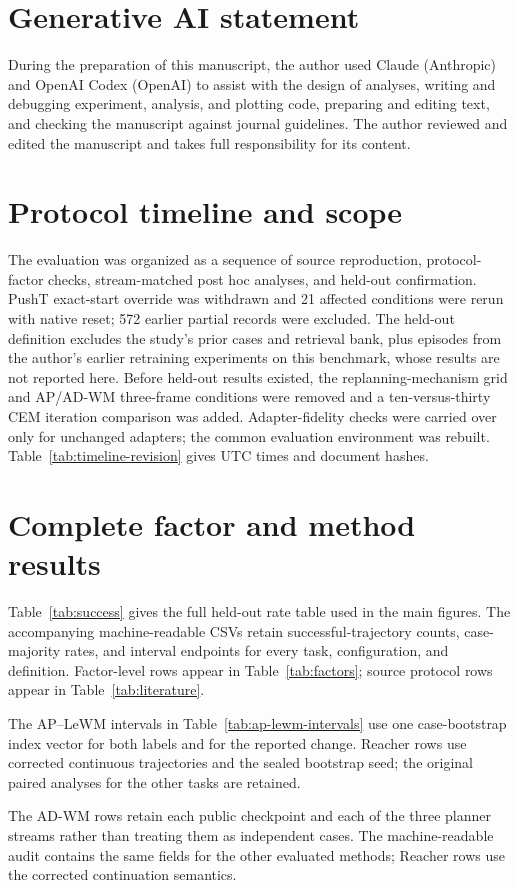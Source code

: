 \documentclass[manuscript,screen,review]{jair}
\begin{document}
\section*{Generative AI statement}
During the preparation of this manuscript, the author used Claude (Anthropic) and OpenAI Codex (OpenAI) to assist with the design of analyses, writing and debugging experiment, analysis, and plotting code, preparing and editing text, and checking the manuscript against journal guidelines. The author reviewed and edited the manuscript and takes full responsibility for its content.

\appendix
\FloatBarrier
\section{Protocol timeline and scope}
The evaluation was organized as a sequence of source reproduction, protocol-factor checks, stream-matched post hoc analyses, and held-out confirmation. PushT exact-start override was withdrawn and 21 affected conditions were rerun with native reset; 572 earlier partial records were excluded. The held-out definition excludes the study's prior cases and retrieval bank, plus episodes from the author's earlier retraining experiments on this benchmark, whose results are not reported here. Before held-out results existed, the replanning-mechanism grid and AP/AD-WM three-frame conditions were removed and a ten-versus-thirty CEM iteration comparison was added. Adapter-fidelity checks were carried over only for unchanged adapters; the common evaluation environment was rebuilt. Table~\ref{tab:timeline-revision} gives UTC times and document hashes.


\FloatBarrier
\section{Complete factor and method results}
Table~\ref{tab:success} gives the full held-out rate table used in the main figures. The accompanying machine-readable CSVs retain successful-trajectory counts, case-majority rates, and interval endpoints for every task, configuration, and definition. Factor-level rows appear in Table~\ref{tab:factors}; source protocol rows appear in Table~\ref{tab:literature}.

The AP--LeWM intervals in Table~\ref{tab:ap-lewm-intervals} use one case-bootstrap index vector for both labels and for the reported change. Reacher rows use corrected continuous trajectories and the sealed bootstrap seed; the original paired analyses for the other tasks are retained.

The AD-WM rows retain each public checkpoint and each of the three planner streams rather than treating them as independent cases. The machine-readable audit contains the same fields for the other evaluated methods; Reacher rows use the corrected continuation semantics.
\end{document}
